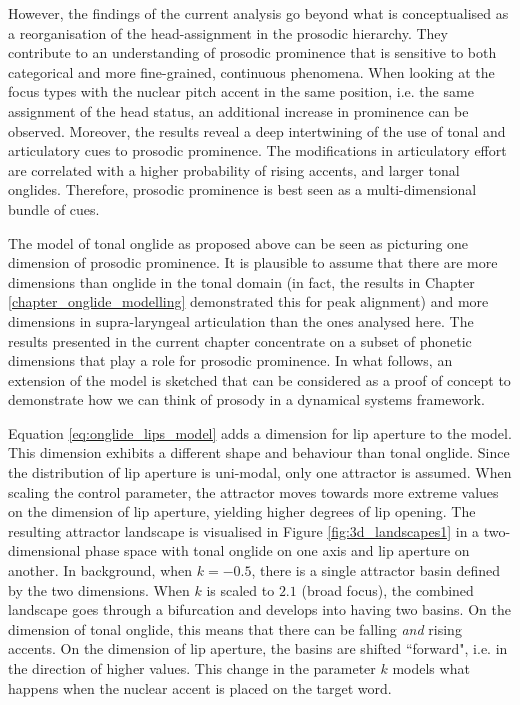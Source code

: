 However, the findings of the current analysis go beyond what is conceptualised as a reorganisation of the head-assignment in the prosodic hierarchy. They contribute to an understanding of prosodic prominence that is sensitive to both categorical and more fine-grained, continuous phenomena. When looking at the focus types with the nuclear pitch accent in the same position, i.e. the same assignment of the head status, an additional increase in prominence can be observed. Moreover, the results reveal a deep intertwining of the use of tonal and articulatory cues to prosodic prominence. The modifications in articulatory effort are correlated with a higher probability of rising accents, and larger tonal onglides. Therefore, prosodic prominence is best seen as a multi-dimensional bundle of cues. 

The model of tonal onglide as proposed above can be seen as picturing one dimension of prosodic prominence. It is plausible to assume that there are more dimensions than onglide in the tonal domain (in fact, the results in Chapter \ref{chapter_onglide_modelling} demonstrated this for peak alignment) and more dimensions in supra-laryngeal articulation than the ones analysed here. The results presented in the current chapter concentrate on a subset of phonetic dimensions that play a role for prosodic prominence. In what follows, an extension of the model is sketched that can be considered as a proof of concept to demonstrate how we can think of prosody in a dynamical systems framework.

Equation \ref{eq:onglide_lips_model} adds a dimension for lip aperture to the model. This dimension exhibits a different shape and behaviour than tonal onglide. Since the distribution of lip aperture is uni-modal, only one attractor is assumed. When scaling the control parameter, the attractor moves towards more extreme values on the dimension of lip aperture, yielding higher degrees of lip opening. The resulting attractor landscape is visualised in Figure \ref{fig:3d_landscapes1} in a two-dimensional phase space with tonal onglide on one axis and lip aperture on another. In background, when $k=-0.5$, there is a single attractor basin defined by the two dimensions. When $k$ is scaled to $2.1$ (broad focus), the combined landscape goes through a bifurcation and develops into having two basins. On the dimension of tonal onglide, this means that there can be falling \emph{and} rising accents. On the dimension of lip aperture, the basins are shifted ``forward", i.e. in the direction of higher values. This change in the parameter $k$ models what happens when the nuclear accent is placed on the target word. 

